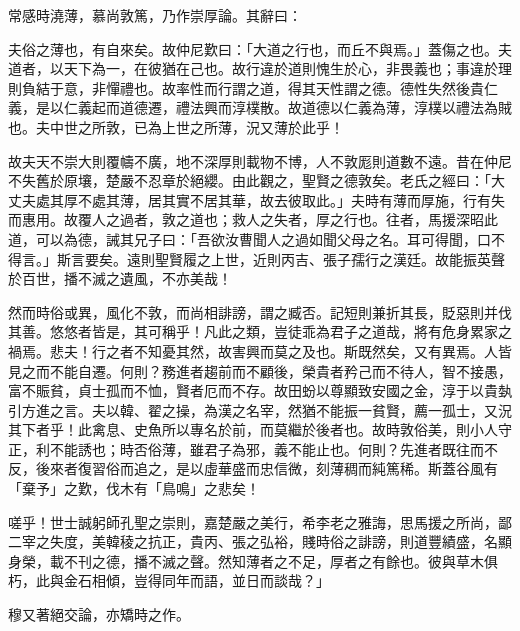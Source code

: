 \begin{pinyinscope}
常感時澆薄，慕尚敦篤，乃作崇厚論。其辭曰：

夫俗之薄也，有自來矣。故仲尼歎曰：「大道之行也，而丘不與焉。」蓋傷之也。夫道者，以天下為一，在彼猶在己也。故行違於道則愧生於心，非畏義也；事違於理則負結于意，非憚禮也。故率性而行謂之道，得其天性謂之德。德性失然後貴仁義，是以仁義起而道德遷，禮法興而淳樸散。故道德以仁義為薄，淳樸以禮法為賊也。夫中世之所敦，已為上世之所薄，況又薄於此乎！

故夫天不崇大則覆幬不廣，地不深厚則載物不博，人不敦厖則道數不遠。昔在仲尼不失舊於原壤，楚嚴不忍章於絕纓。由此觀之，聖賢之德敦矣。老氏之經曰：「大丈夫處其厚不處其薄，居其實不居其華，故去彼取此。」夫時有薄而厚施，行有失而惠用。故覆人之過者，敦之道也；救人之失者，厚之行也。往者，馬援深昭此道，可以為德，誡其兄子曰：「吾欲汝曹聞人之過如聞父母之名。耳可得聞，口不得言。」斯言要矣。遠則聖賢履之上世，近則丙吉、張子孺行之漢廷。故能振英聲於百世，播不滅之遺風，不亦美哉！

然而時俗或異，風化不敦，而尚相誹謗，謂之臧否。記短則兼折其長，貶惡則并伐其善。悠悠者皆是，其可稱乎！凡此之類，豈徒乖為君子之道哉，將有危身累家之禍焉。悲夫！行之者不知憂其然，故害興而莫之及也。斯既然矣，又有異焉。人皆見之而不能自遷。何則？務進者趨前而不顧後，榮貴者矜己而不待人，智不接愚，富不賑貧，貞士孤而不恤，賢者厄而不存。故田蚡以尊顯致安國之金，淳于以貴埶引方進之言。夫以韓、翟之操，為漢之名宰，然猶不能振一貧賢，薦一孤士，又況其下者乎！此禽息、史魚所以專名於前，而莫繼於後者也。故時敦俗美，則小人守正，利不能誘也；時否俗薄，雖君子為邪，義不能止也。何則？先進者既往而不反，後來者復習俗而追之，是以虛華盛而忠信微，刻薄稠而純篤稀。斯蓋谷風有「棄予」之歎，伐木有「鳥鳴」之悲矣！

嗟乎！世士誠躬師孔聖之崇則，嘉楚嚴之美行，希李老之雅誨，思馬援之所尚，鄙二宰之失度，美韓稜之抗正，貴丙、張之弘裕，賤時俗之誹謗，則道豐績盛，名顯身榮，載不刊之德，播不滅之聲。然知薄者之不足，厚者之有餘也。彼與草木俱朽，此與金石相傾，豈得同年而語，並日而談哉？」

穆又著絕交論，亦矯時之作。


\end{pinyinscope}
